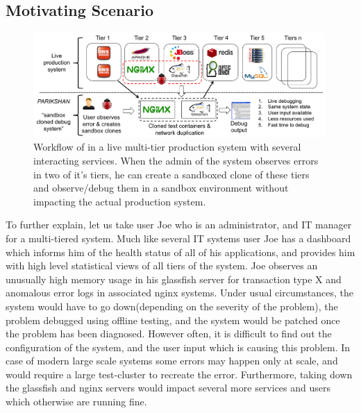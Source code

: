 \subsection{Motivating Scenario}
\label{sec:motivation}

\begin{figure}[ht]
  \begin{center}
    \includegraphics[width=0.99\textwidth]{figs/workflow3.png}
    \caption{Workflow of \parikshan in a live multi-tier production system with several interacting services. When the admin of the system observes errors in two of it's tiers, he can create a sandboxed clone of these tiers and observe/debug them in a sandbox environment without impacting the actual production system.}
    \label{fig:motivation}
  \end{center}
\end{figure}

To further explain, let us take  user Joe who is an administrator, and IT manager for a multi-tiered system. 
Much like several IT systems user Joe has a dashboard which informs him of the health status of all of his applications, and provides him with high level statistical views of all tiers of the system.
Joe observes an unusually high memory usage in his glassfish server for transaction type X and anomalous error logs in associated nginx systems.
Under usual circumstances, the system would have to go down(depending on the severity of the problem), the problem debugged using offline testing,  and the system would be patched once the problem has been diagnosed.
However often, it is difficult to find out the configuration of the system, and the user input which is causing this problem.
In case of modern large scale systems some errors may happen only at scale, and would require a large test-cluster to recreate the error.
Furthermore, taking down the glassfish and nginx servers would impact several more services and users which otherwise are running fine. 

